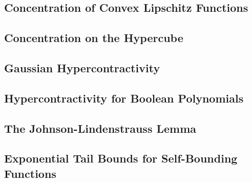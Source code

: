 \documentclass[11pt]{article}
\begin{document}
\subsection{Concentration of Convex Lipschitz Functions}



\subsection{Concentration on the Hypercube}
\subsection{Gaussian Hypercontractivity}
\subsection{Hypercontractivity for Boolean Polynomials}
\subsection{The Johnson-Lindenstrauss Lemma}
\subsection{Exponential Tail Bounds for Self-Bounding Functions}


\newpage


\end{document}
